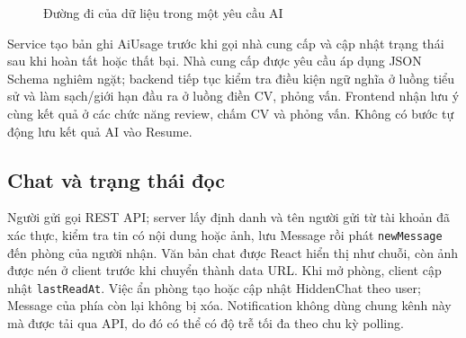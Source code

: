 \begin{figure}[H]
    \centering
    \caption{Đường đi của dữ liệu trong một yêu cầu AI}
    \label{fig:ai-request-flow}
\end{figure}

Service tạo bản ghi AiUsage trước khi gọi nhà cung cấp và cập nhật trạng thái sau khi hoàn tất hoặc thất bại. Nhà cung cấp được yêu cầu áp dụng JSON Schema nghiêm ngặt; backend tiếp tục kiểm tra điều kiện ngữ nghĩa ở luồng tiểu sử và làm sạch/giới hạn đầu ra ở luồng điền CV, phỏng vấn. Frontend nhận lưu ý cùng kết quả ở các chức năng review, chấm CV và phỏng vấn. Không có bước tự động lưu kết quả AI vào Resume.

\subsection{Chat và trạng thái đọc}

Người gửi gọi REST API; server lấy định danh và tên người gửi từ tài khoản đã xác thực, kiểm tra tin có nội dung hoặc ảnh, lưu Message rồi phát \texttt{newMessage} đến phòng của người nhận. Văn bản chat được React hiển thị như chuỗi, còn ảnh được nén ở client trước khi chuyển thành data URL. Khi mở phòng, client cập nhật \texttt{lastReadAt}. Việc ẩn phòng tạo hoặc cập nhật HiddenChat theo user; Message của phía còn lại không bị xóa. Notification không dùng chung kênh này mà được tải qua API, do đó có thể có độ trễ tối đa theo chu kỳ polling.

